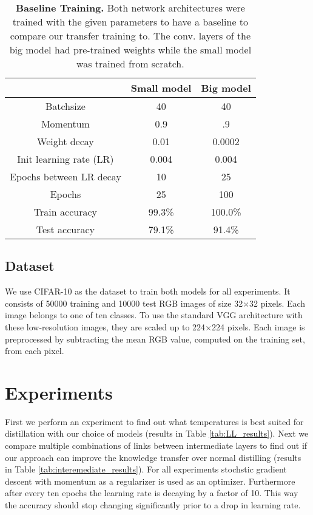 \documentclass[10pt,twocolumn,letterpaper]{article}
\begin{document}
\begin{table}[]
	\begin{center}
	\begin{tabular}{|c|c|c|}
		\hline
									&	Small model & Big model \\ \hline
		Batchsize					&	40			&	40		\\ \hline
		Momentum					&	0.9			&	.9		\\ \hline
		Weight decay				&	0.01		&	0.0002	\\ \hline
		Init learning rate (LR)		&	0.004		&	0.004	\\ \hline
		Epochs between LR decay 	&	10			&	25		\\ \hline
		Epochs						&	25			&	100		\\ \hline
		Train accuracy				&	99.3\%		&	100.0\%	\\ \hline
		Test accuracy				&	79.1\%		&	91.4\%	\\ \hline
	\end{tabular}
	\end{center}
	\caption{\textbf{Baseline Training.} Both network architectures were trained with the given parameters to have a baseline to compare our transfer training to. The conv. layers of the big model had pre-trained weights while the small model was trained from scratch.}
	\label{tab:baseline_small_big}
\end{table}


\subsection{Dataset}
We use CIFAR-10 \cite{krizhevsky2009learning} as the dataset to train both models for all experiments. It consists of 50000 training and 10000 test RGB images of size 32$\times$32 pixels. Each image belongs to one of ten classes. To use the standard VGG architecture with these low-resolution images, they are scaled up to 224$\times$224 pixels. Each image is preprocessed by subtracting the mean RGB value, computed on the training set, from each pixel. 
 

\section{Experiments}
First we perform an experiment to find out what temperatures is best suited for distillation with our choice of models (results in Table \ref{tab:LL_results}). Next we compare multiple combinations of links between intermediate layers to find out if our approach can improve the knowledge transfer over normal distilling (results in Table \ref{tab:interemediate_results}). For all experiments stochstic gradient descent with momentum as a regularizer is used as an optimizer. Furthermore after every ten epochs the learning rate is decaying by a factor of 10. This way the accuracy should stop changing significantly prior to a drop in learning rate.
\end{document}
